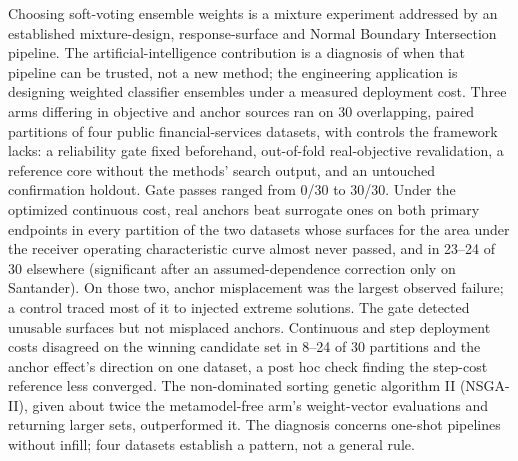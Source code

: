 Choosing soft-voting ensemble weights is a mixture experiment addressed by an established mixture-design,
response-surface and Normal Boundary Intersection pipeline. The artificial-intelligence contribution is a diagnosis
of when that pipeline can be trusted, not a new method; the engineering application is designing weighted classifier
ensembles under a measured deployment cost. Three arms differing in objective and anchor sources ran on 30
overlapping, paired partitions of four public financial-services datasets, with controls the framework lacks: a
reliability gate fixed beforehand, out-of-fold real-objective revalidation, a reference core without the methods' search output,
and an untouched confirmation holdout. Gate passes ranged from 0/30 to 30/30. Under the optimized continuous cost, real anchors beat surrogate ones on both primary endpoints in
every partition of the two datasets whose surfaces for the area under the receiver operating characteristic curve
almost never passed, and in 23--24 of 30 elsewhere (significant after an assumed-dependence correction only on Santander). On those two, anchor misplacement was the largest observed failure; a control traced most of it to injected extreme
solutions. The gate detected unusable surfaces but not misplaced anchors. Continuous and step deployment costs
disagreed on the winning candidate set in 8--24 of 30 partitions and the anchor effect's direction on one dataset,
a post hoc check finding the step-cost reference less converged.
The non-dominated sorting genetic algorithm II (NSGA-II), given about twice the metamodel-free arm's weight-vector
evaluations and returning larger sets, outperformed it. The diagnosis concerns one-shot pipelines without infill; four datasets establish a
pattern, not a general rule.
